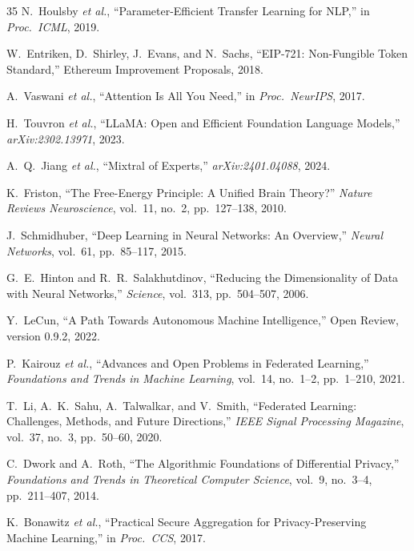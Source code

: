 \documentclass[11pt,letterpaper]{article}
\begin{document}
\begin{thebibliography}{35}
N.~Houlsby \emph{et al.}, ``Parameter-Efficient Transfer Learning for NLP,'' in \emph{Proc.\ ICML}, 2019.

W.~Entriken, D.~Shirley, J.~Evans, and N.~Sachs, ``EIP-721: Non-Fungible Token Standard,'' Ethereum Improvement Proposals, 2018.

A.~Vaswani \emph{et al.}, ``Attention Is All You Need,'' in \emph{Proc.\ NeurIPS}, 2017.

H.~Touvron \emph{et al.}, ``LLaMA: Open and Efficient Foundation Language Models,'' \emph{arXiv:2302.13971}, 2023.

A.~Q.~Jiang \emph{et al.}, ``Mixtral of Experts,'' \emph{arXiv:2401.04088}, 2024.

K.~Friston, ``The Free-Energy Principle: A Unified Brain Theory?'' \emph{Nature Reviews Neuroscience}, vol.~11, no.~2, pp.~127--138, 2010.

J.~Schmidhuber, ``Deep Learning in Neural Networks: An Overview,'' \emph{Neural Networks}, vol.~61, pp.~85--117, 2015.

G.~E.~Hinton and R.~R.~Salakhutdinov, ``Reducing the Dimensionality of Data with Neural Networks,'' \emph{Science}, vol.~313, pp.~504--507, 2006.

Y.~LeCun, ``A Path Towards Autonomous Machine Intelligence,'' Open Review, version 0.9.2, 2022.

P.~Kairouz \emph{et al.}, ``Advances and Open Problems in Federated Learning,'' \emph{Foundations and Trends in Machine Learning}, vol.~14, no.~1--2, pp.~1--210, 2021.

T.~Li, A.~K.~Sahu, A.~Talwalkar, and V.~Smith, ``Federated Learning: Challenges, Methods, and Future Directions,'' \emph{IEEE Signal Processing Magazine}, vol.~37, no.~3, pp.~50--60, 2020.

C.~Dwork and A.~Roth, ``The Algorithmic Foundations of Differential Privacy,'' \emph{Foundations and Trends in Theoretical Computer Science}, vol.~9, no.~3--4, pp.~211--407, 2014.

K.~Bonawitz \emph{et al.}, ``Practical Secure Aggregation for Privacy-Preserving Machine Learning,'' in \emph{Proc.\ CCS}, 2017.

\end{thebibliography}
\end{document}
